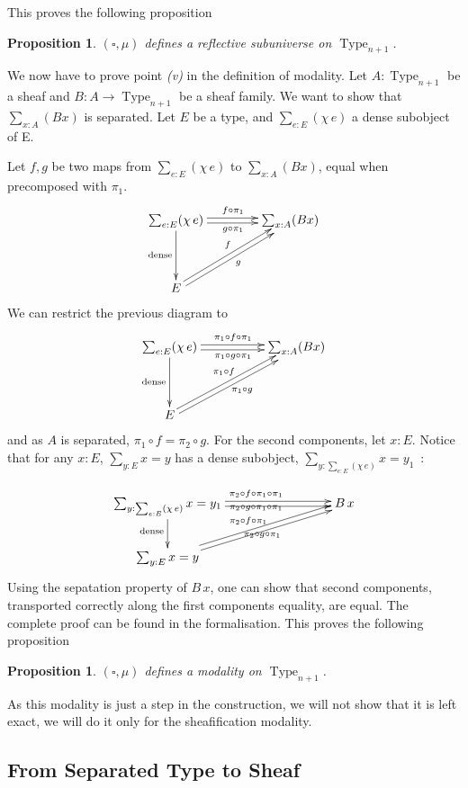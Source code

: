 \documentclass[conference]{IEEEtran}
\makeatletter
\newtheorem{prop}[thm]{Proposition}
\def\dar[#1]#2{\ar@<-#2>[#1]\ar@<#2>[#1]} %
\DeclareMathOperator{\Type}{Type}
\makeatother
\begin{document}
This proves the following proposition
\begin{prop}
  $(\square,\mu)$ defines a reflective subuniverse on $\Type_{n+1}$.
\end{prop}

We now have to prove point {\it (v)} in the definition of
modality. Let $A:\Type_{n+1}$ be a sheaf and $B:A \to \Type_{n+1}$ be
a sheaf family. We want to show that $\sum_{x:A} (Bx)$ is
separated. Let $E$ be a type, and $\sum_{e:E} (\chi\,e)$ a dense
subobject of E.

Let $f,g$ be two maps from $\sum_{e:E} (\chi\,e)$ to $\sum_{x:A}
(Bx)$, equal when precomposed with $\pi_1$.
$$\xymatrix @R=4em @C=4em{
  \sum_{e:E} (\chi\, e) \ar@<-2pt>[r]_{g\circ\pi_1} \ar@<2pt>[r]^{f\circ \pi_1} \ar[d]_{\mathrm{dense}}& \sum_{x :A} (Bx) \\
  E \ar@<-2pt>[ru]_{g} \ar@<2pt>[ru]^{f}&
}$$
We can restrict the previous diagram to 
$$\xymatrix @R=4em @C=5em{
  \sum_{e:E} (\chi\, e) \ar@<-2pt>[r]_{\pi_1\circ g\circ\pi_1} \ar@<2pt>[r]^{\pi_1\circ f\circ \pi_1} \ar[d]_{\mathrm{dense}}& \sum_{x :A} (Bx) \\
  E \ar@<-2pt>[ru]_{\pi_1\circ g} \ar@<2pt>[ru]^{\pi_1\circ f}&
}$$
and as $A$ is separated, $\pi_1\circ f = \pi_2 \circ g$.
For the second components, let $x:E$. Notice that for any $x:E$,
$\sum_{y:E} x = y$ has a dense subobject, $\sum_{y:\sum_{e:E} (\chi\,
  e)} x=y_1$~:

$$\xymatrix{
  \sum_{y:\sum_{e:E} (\chi\,
  e)} x=y_1 \dar[rrr]{2pt}^{\pi_2\circ f\circ\pi_1\circ \pi_1}_{\pi_2\circ g\circ \pi_1\circ \pi_1} \ar[d]_{\mathrm{dense}}&&& B\,x \\
  \sum_{y:E} x = y \dar[rrru]{2pt}^{\pi_2\circ f\circ \pi_1}_{\pi_2\circ g\circ \pi_1}&
}$$
Using the sepatation property of $B\,x$, one can show that second
components, transported correctly along the first components equality,
are equal. The complete proof can be found in the formalisation.
This proves the following proposition
\begin{prop}
  $(\square,\mu)$ defines a modality on $\Type_{n+1}$.
\end{prop}

As this modality is just a step in the construction, we will not show
that it is left exact, we will do it only for the sheafification modality.

\subsection{From Separated Type to Sheaf}
\label{ssec:separated-to-sheaf}
\end{document}
